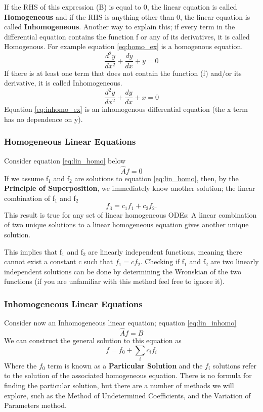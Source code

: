 \documentclass{article}
\newcommand{\be}{\begin{equation}}
\newcommand{\ee}{\end{equation}}
\begin{document}
If the RHS of this expression (B) is equal to 0, the linear equation is called \textbf{Homogeneous} and if the RHS is anything other than 0, the linear equation is called \textbf{Inhomogeneous}.
Another way to explain this; if every term in the differential equation contains the function f or any of its derivatives, it is called Homogenous.
For example equation \ref{eq:homo_ex} is a homogenous equation.
\be \label{eq:homo_ex}
\frac{d^2y}{dx^2} + \frac{dy}{dx} + y = 0
\ee
If there is at least one term that does not contain the function (f) and/or its derivative, it is called Inhomogeneous.
\be \label{eq:inhomo_ex}
\frac{d^2y}{dx^2} + \frac{dy}{dx} + x = 0
\ee
Equation \ref{eq:inhomo_ex} is an inhomogenous differential equation (the x term has no dependence on y).

\subsubsection*{Homogeneous Linear Equations}
Consider equation \ref{eq:lin_homo} below
\be \label{eq:lin_homo}
\hat{A}f = 0
\ee
If we assume f$_1$ and f$_2$ are solutions to equation \ref{eq:lin_homo}, then, by the \textbf{Principle of Superposition}, we immediately know another solution; the linear combination of f$_1$ and f$_2$
\be
f_3 = c_1f_1 + c_2f_2 .
\ee
This result is true for any set of linear homogeneous ODEs: A linear combination of two unique solutions to a linear homogeneous equation gives another unique solution.

This implies that f$_1$ and f$_2$ are linearly independent functions, meaning there cannot exist a constant c such that $f_1 = cf_2$.
Checking if f$_1$ and f$_2$ are two linearly independent solutions can be done by determining the Wronskian of the two functions (if you are unfamiliar with this method feel free to ignore it).

\subsubsection*{Inhomogeneous Linear Equations}
Consider now an Inhomogeneous linear equation; equation \ref{eq:lin_inhomo}
\be \label{eq:lin_inhomo}
\hat{A}f = B
\ee
We can construct the general solution to this equation as
\be
f = f_0 + \sum_i c_i f_i
\ee
Where the $f_0$ term is known as a \textbf{Particular Solution} and the $f_i$ solutions refer to the solution of the associated homogeneous equation.
There is no formula for finding the particular solution, but there are a number of methods we will explore, such as the Method of Undetermined Coefficients, and the Variation of Parameters method.
\end{document}
